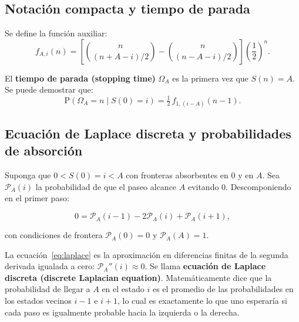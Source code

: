 \documentclass[12pt]{article}
\begin{document}
\subsection{Notaci\'on compacta y tiempo de parada}

Se define la funci\'on auxiliar:
\begin{equation}
  f_{A,i}(n) = \left[\binom{n}{(n+A-i)/2} - \binom{n}{(n-A-i)/2}\right]
               \!\left(\frac{1}{2}\right)^{\!n}.
\end{equation}

El \textbf{tiempo de parada (stopping time)} $\Omega_A$ es la primera vez que
$S(n) = A$. Se puede demostrar que:
\begin{equation}
  \mathrm{P}(\Omega_A = n \mid S(0) = i) = \tfrac{1}{2}\,f_{1,(i-A)}(n-1).
\end{equation}

\subsection{Ecuaci\'on de Laplace discreta y probabilidades de absorci\'on}

Suponga que $0 < S(0) = i < A$ con fronteras absorbentes en $0$ y en $A$.
Sea $\mathcal{P}_A(i)$ la probabilidad de que el paseo alcance $A$ evitando $0$.
Descomponiendo en el primer paso:

\begin{equation}
  0 = \mathcal{P}_A(i-1) - 2\mathcal{P}_A(i) + \mathcal{P}_A(i+1),
  \label{eq:laplace}
\end{equation}

con condiciones de frontera $\mathcal{P}_A(0) = 0$ y $\mathcal{P}_A(A) = 1$.

\begin{intuicionmat}
La ecuaci\'on~\eqref{eq:laplace} es la aproximaci\'on en diferencias finitas de la
segunda derivada igualada a cero: $\mathcal{P}_A''(i) \approx 0$. Se llama
\textbf{ecuaci\'on de Laplace discreta (discrete Laplacian equation)}.
Matem\'aticamente dice que la probabilidad de llegar a $A$ en el estado $i$
es el promedio de las probabilidades en los estados vecinos $i-1$ e $i+1$,
lo cual es exactamente lo que uno esperar\'ia si cada paso es igualmente
probable hacia la izquierda o la derecha.
\end{intuicionmat}
\end{document}
